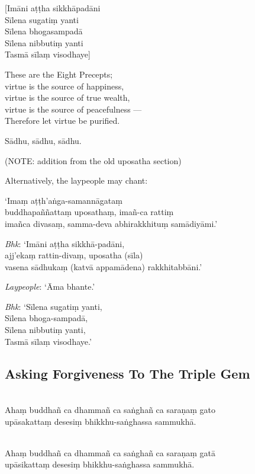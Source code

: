 
[Imāni aṭṭha sikkhāpadāni\\
Sīlena sugatiṃ yanti\\
Sīlena bhogasampadā\\
Sīlena nibbutiṃ yanti\\
Tasmā sīlaṃ visodhaye]

\begin{english}
  These are the Eight Precepts;\\
  virtue is the source of happiness,\\
  virtue is the source of true wealth,\\
  virtue is the source of peacefulness ---\\
  Therefore let virtue be purified.
\end{english}


Sādhu, sādhu, sādhu.


(NOTE: addition from the old uposatha section)

Alternatively, the laypeople may chant:

‘Imaṃ aṭṭh'aṅga-samannāgataṃ\\
buddhapaññattaṃ uposathaṃ, imañ-ca rattiṃ\\
imañca divasaṃ, samma-deva abhirakkhituṃ samādiyāmi.’

\emph{Bhk}: ‘Imāni aṭṭha sikkhā-padāni,\\
ajj'ekaṃ rattin-divaṃ, uposatha (sīla)\\
vasena sādhukaṃ (katvā appamādena) rakkhitabbāni.’

\emph{Laypeople}: ‘Āma bhante.’

\emph{Bhk}:
‘Sīlena sugatiṃ yanti,\\
Sīlena bhoga-sampadā,\\
Sīlena nibbutiṃ yanti,\\
Tasmā sīlaṃ visodhaye.’

\subsection{Asking Forgiveness To The Triple Gem}

\\\relax
Ahaṃ buddhañ ca dhammañ ca saṅghañ ca saraṇaṃ gato\\
upāsakattaṃ desesiṃ bhikkhu-saṅghassa sammukhā.

\\\relax
Ahaṃ buddhañ ca dhammañ ca saṅghañ ca saraṇaṃ gatā\\
upāsikattaṃ desesiṃ bhikkhu-saṅghassa sammukhā.

